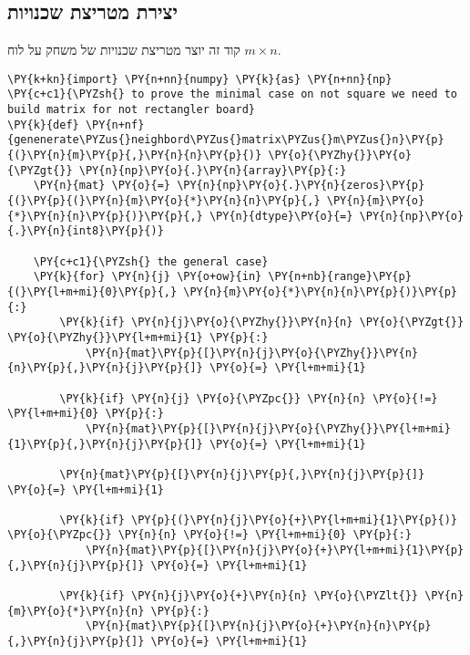 \hypertarget{generate-matrix}{%
\subsection{יצירת מטריצת שכנויות}\label{generate-matrix}}
קוד זה יוצר מטריצת שכנויות של משחק על לוח 
$m \times n$.
\begin{english}
    \begin{tcolorbox}[breakable, size=fbox, boxrule=1pt, pad at break*=1mm,colback=cellbackground, colframe=cellborder]
\begin{Verbatim}[commandchars=\\\{\}]
\PY{k+kn}{import} \PY{n+nn}{numpy} \PY{k}{as} \PY{n+nn}{np}
\PY{c+c1}{\PYZsh{} to prove the minimal case on not square we need to build matrix for not rectangler board}
\PY{k}{def} \PY{n+nf}{genenerate\PYZus{}neighbord\PYZus{}matrix\PYZus{}m\PYZus{}n}\PY{p}{(}\PY{n}{m}\PY{p}{,}\PY{n}{n}\PY{p}{)} \PY{o}{\PYZhy{}}\PY{o}{\PYZgt{}} \PY{n}{np}\PY{o}{.}\PY{n}{array}\PY{p}{:}
    \PY{n}{mat} \PY{o}{=} \PY{n}{np}\PY{o}{.}\PY{n}{zeros}\PY{p}{(}\PY{p}{(}\PY{n}{m}\PY{o}{*}\PY{n}{n}\PY{p}{,} \PY{n}{m}\PY{o}{*}\PY{n}{n}\PY{p}{)}\PY{p}{,} \PY{n}{dtype}\PY{o}{=} \PY{n}{np}\PY{o}{.}\PY{n}{int8}\PY{p}{)}

    \PY{c+c1}{\PYZsh{} the general case}
    \PY{k}{for} \PY{n}{j} \PY{o+ow}{in} \PY{n+nb}{range}\PY{p}{(}\PY{l+m+mi}{0}\PY{p}{,} \PY{n}{m}\PY{o}{*}\PY{n}{n}\PY{p}{)}\PY{p}{:}
        \PY{k}{if} \PY{n}{j}\PY{o}{\PYZhy{}}\PY{n}{n} \PY{o}{\PYZgt{}} \PY{o}{\PYZhy{}}\PY{l+m+mi}{1} \PY{p}{:}
            \PY{n}{mat}\PY{p}{[}\PY{n}{j}\PY{o}{\PYZhy{}}\PY{n}{n}\PY{p}{,}\PY{n}{j}\PY{p}{]} \PY{o}{=} \PY{l+m+mi}{1}

        \PY{k}{if} \PY{n}{j} \PY{o}{\PYZpc{}} \PY{n}{n} \PY{o}{!=} \PY{l+m+mi}{0} \PY{p}{:}
            \PY{n}{mat}\PY{p}{[}\PY{n}{j}\PY{o}{\PYZhy{}}\PY{l+m+mi}{1}\PY{p}{,}\PY{n}{j}\PY{p}{]} \PY{o}{=} \PY{l+m+mi}{1}

        \PY{n}{mat}\PY{p}{[}\PY{n}{j}\PY{p}{,}\PY{n}{j}\PY{p}{]} \PY{o}{=} \PY{l+m+mi}{1}

        \PY{k}{if} \PY{p}{(}\PY{n}{j}\PY{o}{+}\PY{l+m+mi}{1}\PY{p}{)} \PY{o}{\PYZpc{}} \PY{n}{n} \PY{o}{!=} \PY{l+m+mi}{0} \PY{p}{:}
            \PY{n}{mat}\PY{p}{[}\PY{n}{j}\PY{o}{+}\PY{l+m+mi}{1}\PY{p}{,}\PY{n}{j}\PY{p}{]} \PY{o}{=} \PY{l+m+mi}{1}

        \PY{k}{if} \PY{n}{j}\PY{o}{+}\PY{n}{n} \PY{o}{\PYZlt{}} \PY{n}{m}\PY{o}{*}\PY{n}{n} \PY{p}{:}
            \PY{n}{mat}\PY{p}{[}\PY{n}{j}\PY{o}{+}\PY{n}{n}\PY{p}{,}\PY{n}{j}\PY{p}{]} \PY{o}{=} \PY{l+m+mi}{1}
    

\end{Verbatim}
\end{tcolorbox}
\end{english}
